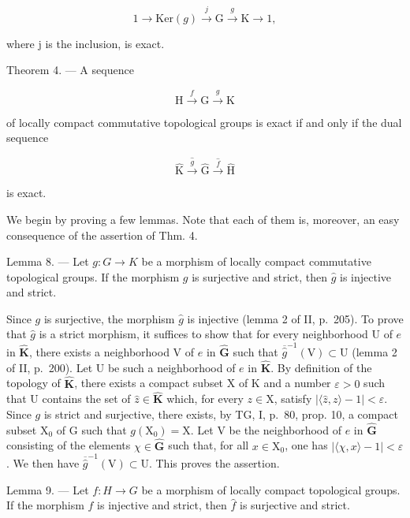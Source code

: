 \[
1 \to \mathrm{Ker} (g) \stackrel {j} {\longrightarrow} \mathrm{G} \stackrel {g} {\longrightarrow} \mathrm{K} \to 1,
\]

where j is the inclusion, is exact.

Theorem 4. --- A sequence

\[
\mathrm{H} \xrightarrow {f} \mathrm{G} \xrightarrow {g} \mathrm{K}
\]

of locally compact commutative topological groups is exact if and only if the dual sequence

\[
\widehat {\mathrm{K}} \xrightarrow {\widehat {g}} \widehat {\mathrm{G}} \xrightarrow {\widehat {f}} \widehat {\mathrm{H}}
\]

is exact.

We begin by proving a few lemmas. Note that each of them is, moreover, an easy consequence of the assertion of Thm. 4.

Lemma 8. --- Let \(g \colon G \to K\) be a morphism of locally compact commutative topological groups. If the morphism \(g\) is surjective and strict, then \(\widehat{g}\) is injective and strict.

Since \(g\) is surjective, the morphism \(\widehat{g}\) is injective (lemma 2 of II, p.~205). To prove that \(\widehat{g}\) is a strict morphism, it suffices to show that for every neighborhood U of \(e\) in \(\widehat{\mathbf{K}}\), there exists a neighborhood V of \(e\) in \(\widehat{\mathbf{G}}\) such that \(\overline{\widehat{g}}^{-1} (\mathrm{V})\subset \mathrm{U}\) (lemma 2 of II, p.~200). Let U be such a neighborhood of \(e\) in \(\widehat{\mathbf{K}}\). By definition of the topology of \(\widehat{\mathbf{K}}\), there exists a compact subset X of K and a number \(\varepsilon >0\) such that U contains the set of \(\widehat{z}\in \widehat{\mathbf{K}}\) which, for every \(z\in \mathrm{X}\), satisfy \(|\langle \widehat{z},z\rangle -1| < \varepsilon\). Since \(g\) is strict and surjective, there exists, by TG, I, p.~80, prop. 10, a compact subset \(\mathrm{X}_0\) of G such that \(g(\mathrm{X}_0) = \mathrm{X}\). Let V be the neighborhood of \(e\) in \(\widehat{\mathbf{G}}\) consisting of the elements \(\chi \in \widehat{\mathbf{G}}\) such that, for all \(x\in \mathrm{X}_0\), one has \(|\langle \chi ,x\rangle -1| < \varepsilon\). We then have \(\overline{\widehat{g}}^{-1} (\mathrm{V})\subset \mathrm{U}\). This proves the assertion.

Lemma 9. --- Let \(f\colon H\to G\) be a morphism of locally compact topological groups. If the morphism \(f\) is injective and strict, then \(\widehat{f}\) is surjective and strict.

